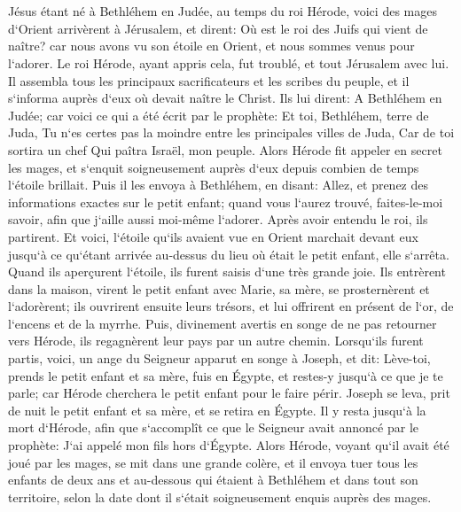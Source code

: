 \chapter{}

\verse Jésus étant né à Bethléhem en Judée, au temps du roi Hérode, voici des mages d`Orient arrivèrent à Jérusalem, 
\verse et dirent: Où est le roi des Juifs qui vient de naître? car nous avons vu son étoile en Orient, et nous sommes venus pour l`adorer. 
\verse Le roi Hérode, ayant appris cela, fut troublé, et tout Jérusalem avec lui. 
\verse Il assembla tous les principaux sacrificateurs et les scribes du peuple, et il s`informa auprès d`eux où devait naître le Christ. 
\verse Ils lui dirent: A Bethléhem en Judée; car voici ce qui a été écrit par le prophète: 
\verse Et toi, Bethléhem, terre de Juda, Tu n`es certes pas la moindre entre les principales villes de Juda, Car de toi sortira un chef Qui paîtra Israël, mon peuple. 
\verse Alors Hérode fit appeler en secret les mages, et s`enquit soigneusement auprès d`eux depuis combien de temps l`étoile brillait. 
\verse Puis il les envoya à Bethléhem, en disant: Allez, et prenez des informations exactes sur le petit enfant; quand vous l`aurez trouvé, faites-le-moi savoir, afin que j`aille aussi moi-même l`adorer. 
\verse Après avoir entendu le roi, ils partirent. Et voici, l`étoile qu`ils avaient vue en Orient marchait devant eux jusqu`à ce qu`étant arrivée au-dessus du lieu où était le petit enfant, elle s`arrêta. 
\verse Quand ils aperçurent l`étoile, ils furent saisis d`une très grande joie. 
\verse Ils entrèrent dans la maison, virent le petit enfant avec Marie, sa mère, se prosternèrent et l`adorèrent; ils ouvrirent ensuite leurs trésors, et lui offrirent en présent de l`or, de l`encens et de la myrrhe. 
\verse Puis, divinement avertis en songe de ne pas retourner vers Hérode, ils regagnèrent leur pays par un autre chemin. 
\verse Lorsqu`ils furent partis, voici, un ange du Seigneur apparut en songe à Joseph, et dit: Lève-toi, prends le petit enfant et sa mère, fuis en Égypte, et restes-y jusqu`à ce que je te parle; car Hérode cherchera le petit enfant pour le faire périr. 
\verse Joseph se leva, prit de nuit le petit enfant et sa mère, et se retira en Égypte. 
\verse Il y resta jusqu`à la mort d`Hérode, afin que s`accomplît ce que le Seigneur avait annoncé par le prophète: J`ai appelé mon fils hors d`Égypte. 
\verse Alors Hérode, voyant qu`il avait été joué par les mages, se mit dans une grande colère, et il envoya tuer tous les enfants de deux ans et au-dessous qui étaient à Bethléhem et dans tout son territoire, selon la date dont il s`était soigneusement enquis auprès des mages. 
